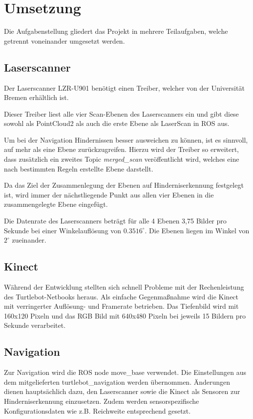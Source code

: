 \chapter{Umsetzung}
Die Aufgabenstellung gliedert das Projekt in mehrere Teilaufgaben, welche getrennt voneinander umgesetzt werden.

\section{Laserscanner}
Der Laserscanner LZR-U901 benötigt einen Treiber, welcher von der Universität Bremen erhältlich ist.

Dieser Treiber liest alle vier Scan-Ebenen des Laserscanners ein und gibt diese sowohl als PointCloud2 als auch die erste Ebene als LaserScan in ROS aus.

Um bei der Navigation Hindernissen besser ausweichen zu können, ist es sinnvoll, auf mehr als eine Ebene zurückzugreifen. Hierzu wird der Treiber so erweitert, dass zusätzlich ein zweites Topic \emph{merged\_scan} veröffentlicht wird, welches eine nach bestimmten Regeln erstellte Ebene darstellt.

Da das Ziel der Zusammenlegung der Ebenen auf Hinderniserkennung festgelegt ist, wird immer der nächstliegende Punkt aus allen vier Ebenen in die zusammengelegte Ebene eingefügt.

Die Datenrate des Laserscanners beträgt für alle 4 Ebenen 3,75 Bilder pro Sekunde bei einer Winkelauflösung von $0.3516^\circ$. Die Ebenen liegen im Winkel von $2^\circ$ zueinander.



\section{Kinect}
Während der Entwicklung stellten sich schnell Probleme mit der Rechenleistung des Turtlebot-Netbooks heraus. Als einfache Gegenmaßnahme wird die Kinect mit verringerter Auflösung- und Framerate betrieben. Das Tiefenbild wird mit 160x120 Pixeln und das RGB Bild mit 640x480 Pixeln bei jeweils 15 Bildern pro Sekunde verarbeitet.

\section{Navigation}
Zur Navigation wird die ROS node move\_base verwendet. Die Einstellungen aus dem mitgelieferten turtlebot\_navigation werden übernommen. Änderungen dienen hauptsächlich dazu, den Laserscanner sowie die Kinect als Sensoren zur Hinderniserkennung einzusetzen. Zudem werden sensorspezifische Konfigurationsdaten wie z.B. Reichweite entsprechend gesetzt.

